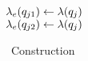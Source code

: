 \begin{algorithm}[H]
{{{      $\lambda_e(q_{j1})\leftarrow \lambda(q_j)$ \\ \label{line:lambda-update0}
      $\lambda_e(q_{j2})\leftarrow \lambda(q_j)$ \\  \label{line:lambda-update1}
     }  
   }   
} 

\caption{\Exltl~Construction}
\label{alg:extendedmonalg}
\end{algorithm}

